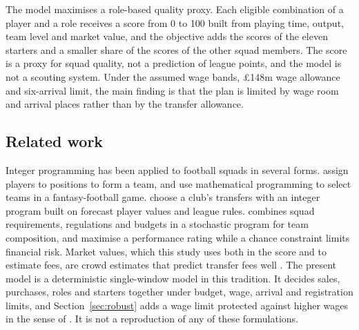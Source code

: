 The model maximises a role-based quality proxy. Each eligible combination of a player and a role receives a score from 0 to 100 built from playing time, output, team level and market value, and the objective adds the scores of the eleven starters and a smaller share of the scores of the other squad members. The score is a proxy for squad quality, not a prediction of league points, and the model is not a scouting system. Under the assumed wage bands, \pounds 148m wage allowance and six-arrival limit, the main finding is that the plan is limited by wage room and arrival places rather than by the transfer allowance.

\subsection{Related work}

Integer programming has been applied to football squads in several forms. \citet{boon2003} assign players to positions to form a team, and \citet{bonomo2014} use mathematical programming to select teams in a fantasy-football game. \citet{payyappalli2019} choose a club's transfers with an integer program built on forecast player values and league rules. \citet{pantuso2017} combines squad requirements, regulations and budgets in a stochastic program for team composition, and \citet{pantuso2021} maximise a performance rating while a chance constraint limits financial risk. Market values, which this study uses both in the score and to estimate fees, are crowd estimates that predict transfer fees well \citep{herm2014,muller2017}. The present model is a deterministic single-window model in this tradition. It decides sales, purchases, roles and starters together under budget, wage, arrival and registration limits, and Section~\ref{sec:robust} adds a wage limit protected against higher wages in the sense of \citet{bertsimas2004}. It is not a reproduction of any of these formulations.
